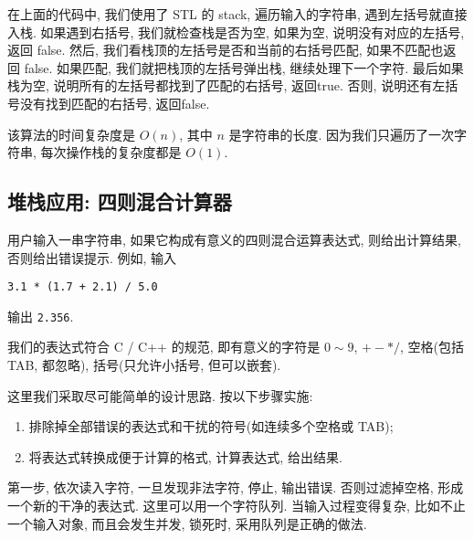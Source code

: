 \documentclass[a4paper]{ctexart}
\theoremstyle{definition}
\theoremstyle{definition}
\begin{document}
在上面的代码中, 我们使用了 STL 的 stack, 遍历输入的字符串, 遇到左括号就直接入栈. 
如果遇到右括号, 我们就检查栈是否为空, 如果为空, 说明没有对应的左括号, 返回 false. 
然后, 我们看栈顶的左括号是否和当前的右括号匹配, 如果不匹配也返回 false. 如果匹配, 
我们就把栈顶的左括号弹出栈, 继续处理下一个字符. 最后如果栈为空, 
说明所有的左括号都找到了匹配的右括号, 返回true. 否则, 说明还有左括号没有找到匹配的右括号, 
返回false. 

该算法的时间复杂度是 $O(n)$, 其中 $n$ 是字符串的长度. 因为我们只遍历了一次字符串, 
每次操作栈的复杂度都是 $O(1)$.

\subsection{堆栈应用: 四则混合计算器}

用户输入一串字符串, 如果它构成有意义的四则混合运算表达式, 则给出计算结果, 
否则给出错误提示. 例如, 输入
\begin{verbatim}
3.1 * (1.7 + 2.1) / 5.0
\end{verbatim}
输出 \verb|2.356|. 

我们的表达式符合 C / C++ 的规范, 即有意义的字符是 $0 \sim 9$, $+ - *
/$, 空格(包括 TAB, 都忽略), 括号(只允许小括号, 但可以嵌套).

这里我们采取尽可能简单的设计思路. 按以下步骤实施:

\begin{enumerate}
\item 排除掉全部错误的表达式和干扰的符号(如连续多个空格或 TAB);
\item 将表达式转换成便于计算的格式, 计算表达式, 给出结果.
\end{enumerate}

第一步, 依次读入字符, 一旦发现非法字符, 停止, 输出错误. 否则过滤掉空格,
形成一个新的干净的表达式. 这里可以用一个字符队列. 当输入过程变得复杂,
比如不止一个输入对象, 而且会发生并发, 锁死时, 采用队列是正确的做法.
\end{document}
